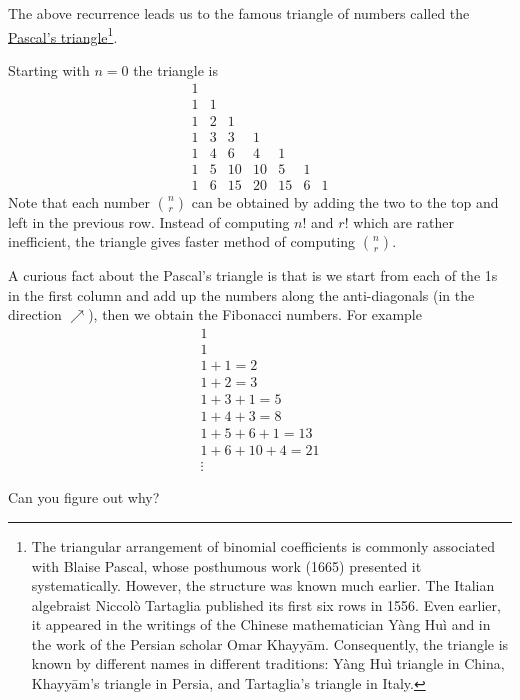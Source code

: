 The above recurrence leads us to the famous triangle of numbers called the \href{https://mathworld.wolfram.com/PascalsTriangle.html}{Pascal's triangle}\footnote{The triangular arrangement of binomial coefficients is commonly associated
with Blaise Pascal, whose posthumous work (1665) presented it systematically.
However, the structure was known much earlier. The Italian algebraist 
Niccol\`o Tartaglia published its first six rows in 1556. Even earlier, it
appeared in the writings of the Chinese mathematician Y\`ang Hu\`i and in the
work of the Persian scholar Omar Khayy\=am. Consequently, the triangle is known
by different names in different traditions:  Y\`ang Hu\`i triangle in China,
Khayy\=am's triangle in Persia, and Tartaglia's triangle in Italy.}.

Starting with $n=0$ the triangle is
\[
\begin{array}{lllllll}
1 \\
1 & 1 \\
1 & 2 & 1 \\
1 & 3 & 3  & 1 \\
1 & 4 & 6  & 4  & 1 \\
1 & 5 & 10 & 10 & 5 & 1 \\
1 & 6 & 15  & 20  & 15 &  6 &  1 
\end{array}
\]
Note that each number $\binom{n}{r}$ can be obtained by adding the two to the top and left in the previous row. Instead of computing $n!$ and $r!$ which are rather inefficient, the triangle gives faster method of computing $\binom{n}{r}$.

\begin{exercise}
A curious fact about the Pascal's triangle is that is we start from each of the 1s in the first column and add up the numbers along the anti-diagonals (in the direction $\nearrow$), then we obtain the Fibonacci numbers.  For example
\[
\begin{array}{l}
1 \\
1 \\
1 + 1 = 2\\
1 + 2 = 3 \\
1 + 3 + 1 = 5 \\
1 + 4 + 3 = 8 \\
1 + 5 + 6 + 1 = 13 \\
1 + 6 + 10 + 4 = 21 \\
\vdots
\end{array}
\]

Can you figure out why?
\end{exercise}

